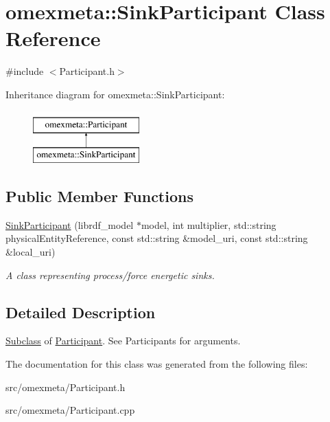 \hypertarget{classomexmeta_1_1SinkParticipant}{}\section{omexmeta\+:\+:Sink\+Participant Class Reference}
\label{classomexmeta_1_1SinkParticipant}


{\ttfamily \#include $<$Participant.\+h$>$}

Inheritance diagram for omexmeta\+:\+:Sink\+Participant\+:\begin{figure}[H]
\begin{center}
\leavevmode
\includegraphics[height=2.000000cm]{classomexmeta_1_1SinkParticipant}
\end{center}
\end{figure}
\subsection*{Public Member Functions}
\begin{DoxyCompactItemize}
\item 
\mbox{\label{classomexmeta_1_1SinkParticipant_a0adac71db2271549cbb6dc17346d89b7}} 
\hyperlink{classomexmeta_1_1SinkParticipant_a0adac71db2271549cbb6dc17346d89b7}{Sink\+Participant} (librdf\+\_\+model $\ast$model, int multiplier, std\+::string physical\+Entity\+Reference, const std\+::string \&model\+\_\+uri, const std\+::string \&local\+\_\+uri)
\begin{DoxyCompactList}\small\item\em A class representing process/force energetic sinks. \end{DoxyCompactList}\end{DoxyCompactItemize}


\subsection{Detailed Description}
\hyperlink{classSubclass}{Subclass} of \hyperlink{classomexmeta_1_1Participant}{Participant}. See Participants for arguments. 

The documentation for this class was generated from the following files\+:\begin{DoxyCompactItemize}
\item 
src/omexmeta/Participant.\+h\item 
src/omexmeta/Participant.\+cpp\end{DoxyCompactItemize}
